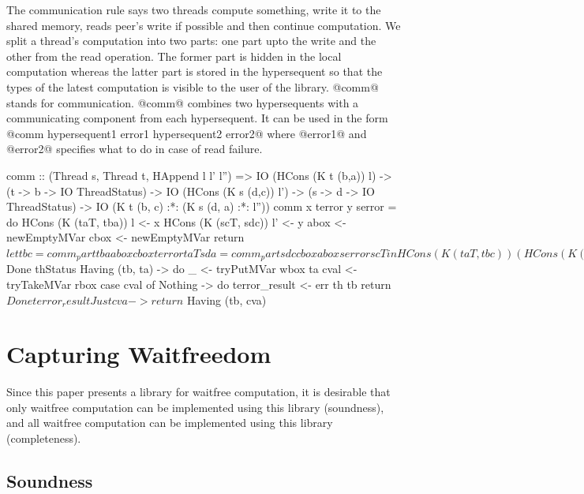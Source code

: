 \documentclass[doctor]{iscs-thesis}
\begin{document}
The communication rule says two threads compute something, write it to
the shared memory, reads peer's write if possible and then continue
computation. We split a thread's computation into two parts: one part
upto the write and the other from the read operation. The former part is
hidden in the local computation whereas the latter part is stored in the
hypersequent so that the types of the latest computation is visible to
the user of the library.
@comm@ stands for communication.  @comm@ combines two hypersequents with
a communicating component from each hypersequent.
It can be used in the form @comm hypersequent1 error1 hypersequent2
error2@ where @error1@ and
@error2@ specifies what to do in case of read failure.
\begin{code}
comm :: (Thread s, Thread t, HAppend l l' l'') =>
        IO (HCons (K t (b,a)) l)
         -> (t -> b -> IO ThreadStatus)
         -> IO (HCons (K s (d,c)) l')
         -> (s -> d -> IO ThreadStatus)
         -> IO (K t (b, c) :*: (K s (d, a) :*: l''))
comm x terror y serror = do
  HCons (K (taT, tba)) l <- x
  HCons (K (scT, sdc)) l' <- y
  abox <- newEmptyMVar
  cbox <- newEmptyMVar
  return $ let 
      tbc = comm_part tba abox cbox terror taT
      sda = comm_part sdc cbox abox serror scT
    in
    HCons (K (taT, tbc))
      (HCons (K (scT, sda)) (hAppend l l'))
    where
      comm_part tba wbox rbox err th = do
            maybeba <- tba
            case maybeba of
              Done thStatus -> return $ Done thStatus
              Having (tb, ta) -> do
                _ <- tryPutMVar wbox ta
                cval <- tryTakeMVar rbox
                case cval of
                  Nothing -> do
                    terror_result <- err th tb
                    return $ Done terror_result
                  Just cva -> return $ Having (tb, cva)
\end{code}

\section{Capturing Waitfreedom}

Since this paper presents a library for waitfree computation, it is
desirable that only waitfree computation can be implemented using this
library (soundness), and all waitfree computation can be implemented
using this library (completeness).

\subsection{Soundness}
\end{document}
